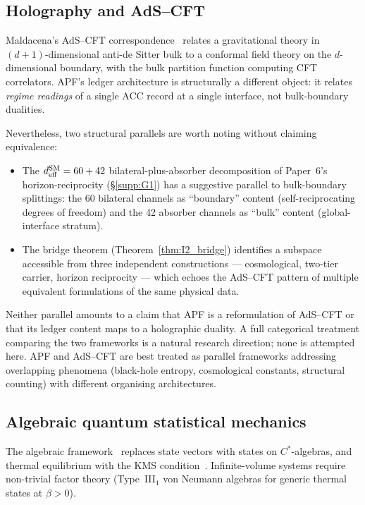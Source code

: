 \documentclass[11pt]{article}
\theoremstyle{plain}
\theoremstyle{definition}
\theoremstyle{remark}
\begin{document}
\bigskip

\subsection{Holography and AdS--CFT}\label{supp:N2}

Maldacena's AdS--CFT correspondence~\cite{Maldacena1999} relates a gravitational theory in $(d+1)$-dimensional anti-de Sitter bulk to a conformal field theory on the $d$-dimensional boundary, with the bulk partition function computing CFT correlators.  APF's ledger architecture is structurally a different object: it relates \emph{regime readings} of a single ACC record at a single interface, not bulk-boundary dualities.

Nevertheless, two structural parallels are worth noting without claiming equivalence:
\begin{itemize}[leftmargin=2em,itemsep=2pt]
  \item The $d_{\rm eff}^{\rm SM} = 60 + 42$ bilateral-plus-absorber decomposition of Paper~6's horizon-reciprocity (\S\ref{supp:G1}) has a suggestive parallel to bulk-boundary splittings: the 60 bilateral channels as ``boundary'' content (self-reciprocating degrees of freedom) and the 42 absorber channels as ``bulk'' content (global-interface stratum).
  \item The bridge theorem (Theorem~\ref{thm:I2_bridge}) identifies a subspace accessible from three independent constructions --- cosmological, two-tier carrier, horizon reciprocity --- which echoes the AdS--CFT pattern of multiple equivalent formulations of the same physical data.
\end{itemize}
Neither parallel amounts to a claim that APF is a reformulation of AdS--CFT or that its ledger content maps to a holographic duality.  A full categorical treatment comparing the two frameworks is a natural research direction; none is attempted here.  APF and AdS--CFT are best treated as parallel frameworks addressing overlapping phenomena (black-hole entropy, cosmological constants, structural counting) with different organising architectures.

\bigskip

\subsection{Algebraic quantum statistical mechanics}\label{supp:N3}

The algebraic framework~\cite{BratelliRobinson,Haag1992} replaces state vectors with states on $C^*$-algebras, and thermal equilibrium with the KMS condition~\cite{KuboMartinSchwinger}.  Infinite-volume systems require non-trivial factor theory (Type~III$_1$ von Neumann algebras for generic thermal states at $\beta > 0$).
\end{document}

